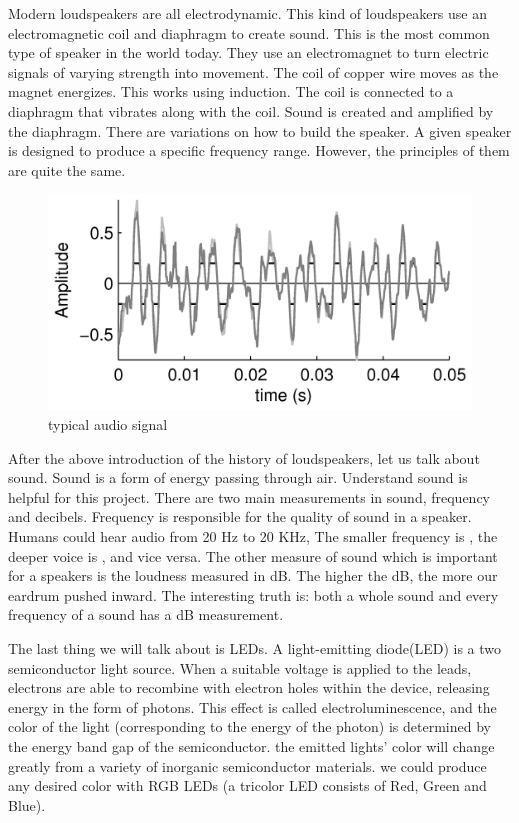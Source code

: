 \documentclass[12pt,a4paper,journal]{IEEEtran}
\begin{document}
Modern loudspeakers are all electrodynamic. This kind of loudspeakers use an electromagnetic coil and diaphragm to create sound. This is the most common type of speaker in the world today. They use an electromagnet to turn electric signals of varying strength into movement. The coil of copper wire moves as the magnet energizes. This works using induction. The coil is connected to a diaphragm that vibrates along with the coil. Sound is created and amplified by the diaphragm. There are variations on how to build the speaker. A given speaker is designed to produce a specific frequency range. However, the principles of them are quite the same.
\begin{figure}[h]
  \centering
  \includegraphics[width=0.9\linewidth]{audiosignal.png}
  \caption{typical audio signal}
  \label{fig:as}
\end{figure}
After the above introduction of the history of loudspeakers, let us talk about sound. Sound is a form of energy passing through air. Understand sound is helpful for this project. There are two main measurements in sound, frequency and decibels. Frequency is responsible for the quality of sound in a speaker. Humans could hear audio from 20 Hz to 20 KHz, The smaller frequency is , the deeper voice is , and vice versa. The other measure of sound which is important for a speakers is the loudness measured in dB. The higher the dB, the more our eardrum pushed inward. The interesting truth is: both a whole sound and every frequency of a sound has a dB measurement.

The last thing we will talk about is LEDs. A light-emitting diode(LED) is a two semiconductor light source. When a suitable voltage is applied to the leads, electrons are able to recombine with electron holes within the device, releasing energy in the form of photons. This effect is called electroluminescence, and the color of the light (corresponding to the energy of the photon) is determined by the energy band gap of the semiconductor. the emitted lights' color will change greatly from a variety of inorganic semiconductor materials. we could produce any desired color with RGB LEDs (a tricolor LED consists of Red, Green and Blue).
\end{document}
